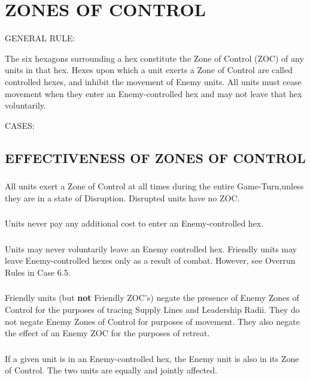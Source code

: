 \section{ZONES OF CONTROL}

GENERAL RULE:

The six hexagons surrounding a hex constitute the Zone of Control (ZOC) of any units in that hex. Hexes upon which a unit exerts a Zone of Control are called controlled hexes, and inhibit the movement of Enemy units. All units must cease movement when they enter an Enemy-controlled hex and may not leave that hex voluntarily.

CASES:

\subsection{EFFECTIVENESS OF ZONES OF CONTROL}

\subsubsection{} All units exert a Zone of Control at all times during the entire Game-Turn,unless they are in a state of Disruption. Disrupted units have no ZOC.

\subsubsection{} Units never pay any additional cost to enter an Enemy-controlled hex.

\subsubsection{} Units may never voluntarily leave an Enemy controlled hex. Friendly units may leave Enemy-controlled hexes only as a result of combat. However, see Overrun Rules in Case 6.5.

\subsubsection{} Friendly units (but \textbf{not} Friendly ZOC's) negate the presence of Enemy Zones of Control for the purposes of tracing Supply Lines and Leadership Radii. They do not negate Enemy Zones of Control for purposes of movement. They also negate the effect of an Enemy ZOC for the purposes of retreat.

\subsubsection{} If a given unit is in an Enemy-controlled hex, the Enemy unit is also in its Zone of Control. The two units are equally and jointly affected.

